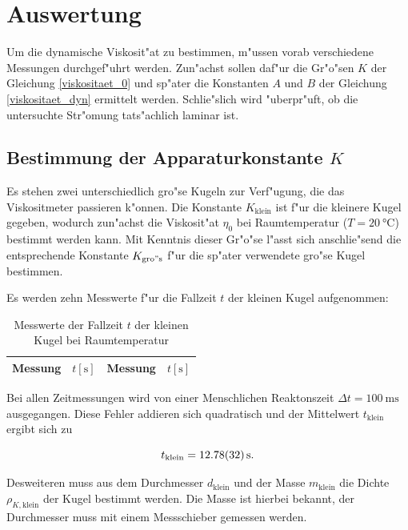 \section{Auswertung}
	\label{sec:auswertung}

	Um die dynamische Viskosit"at zu bestimmen, m"ussen vorab verschiedene Messungen durchgef"uhrt werden.
	Zun"achst sollen daf"ur die Gr"o"sen $K$ der Gleichung \eqref{viskositaet_0} und sp"ater die Konstanten $A$ und $B$ der Gleichung \eqref{viskositaet_dyn} ermittelt werden.
	Schlie"slich wird "uberpr"uft, ob die untersuchte Str"omung tats"achlich laminar ist.

	\subsection{Bestimmung der Apparaturkonstante $K$} %
		\label{sub:bestimmung_k}

		Es stehen zwei unterschiedlich gro"se Kugeln zur Verf"ugung, die das Viskositmeter pas\-sie\-ren k"onnen.
		Die Konstante $K_\mathrm{klein}$ ist f"ur die kleinere Kugel gegeben, wodurch zun"achst die Viskosit"at $\eta_0$ bei Raumtemperatur ($T = \SI{20}{\celsius}$) bestimmt werden kann.
		Mit Kenntnis dieser Gr"o"se l"asst sich anschlie"send die entsprechende Konstante $K_\mathrm{gro"s}$ f"ur die sp"ater ver\-wen\-de\-te gro"se Kugel bestimmen.

		Es werden zehn Messwerte f"ur die Fallzeit $t$ der kleinen Kugel aufgenommen:

		\begin{table}[h!]
			\centering
			\caption{Messwerte der Fallzeit $t$ der kleinen Kugel bei Raumtemperatur}
			\begin{tabular}{|c|c||c|c|}
				\hline
				Messung & $t [\mathrm{s}]$ & Messung & $t [\mathrm{s}]$ \\
				\hline
				\hline
				
				\hline
			\end{tabular}
		\end{table}

		Bei allen Zeitmessungen wird von einer Menschlichen Reaktonszeit $\Delta t = \SI{100}{\milli \second}$ aus\-ge\-gan\-gen.
		Diese Fehler addieren sich quadratisch und der Mittelwert $t_\mathrm{klein}$ ergibt sich zu

		\begin{equation*}
			t_\mathrm{klein} = \SI{12.78 (32)}{\second} .
		\end{equation*}

		Desweiteren muss aus dem Durchmesser $d_\mathrm{klein}$ und der Masse $m_\mathrm{klein}$ die Dichte $\rho_{K,\mathrm{klein}}$ der Kugel bestimmt werden. Die Masse ist hierbei bekannt, der Durchmesser muss mit einem Messschieber gemessen werden.

